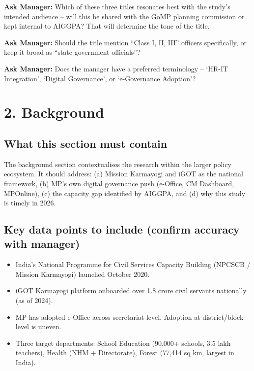 \documentclass[12pt,a4paper]{article}
\newcommand{\managerQ}[1]{%
  \begin{tcolorbox}[colback=govgold!10,colframe=govgold,boxrule=0.5pt,arc=2mm,
    left=4pt,right=4pt,top=2pt,bottom=2pt]
    \small\textbf{Ask Manager:} #1
  \end{tcolorbox}
}
\begin{document}
\managerQ{Which of these three titles resonates best with the study's intended audience -- will this be shared with the GoMP planning commission or kept internal to AIGGPA? That will determine the tone of the title.}

\managerQ{Should the title mention ``Class I, II, III'' officers specifically, or keep it broad as ``state government officials''?}

\managerQ{Does the manager have a preferred terminology -- `HR-IT Integration', `Digital Governance', or `e-Governance Adoption'?}

\vspace{0.4cm}

\section{2. Background}

\subsection{What this section must contain}
The background section contextualises the research within the larger policy ecosystem. It should address: (a) Mission Karmayogi and iGOT as the national framework, (b) MP's own digital governance push (e-Office, CM Dashboard, MPOnline), (c) the capacity gap identified by AIGGPA, and (d) why this study is timely in 2026.

\subsection{Key data points to include (confirm accuracy with manager)}
\begin{itemize}[leftmargin=1.5em]
  \item India's National Programme for Civil Services Capacity Building (NPCSCB / Mission Karmayogi) launched October 2020.
  \item iGOT Karmayogi platform onboarded over 1.8 crore civil servants nationally (as of 2024).
  \item MP has adopted e-Office across secretariat level. Adoption at district/block level is uneven.
  \item Three target departments: School Education (90,000+ schools, 3.5 lakh teachers), Health (NHM + Directorate), Forest (77,414 sq km, largest in India).
\end{itemize}
\end{document}

